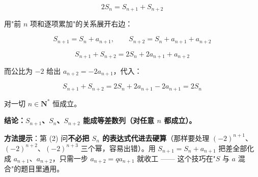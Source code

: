 \begin{answer}
\nopagebreak[4]
\[2S_n=S_{n+1}+S_{n+2}\]

用"前 $n$ 项和逐项累加"的关系展开右边：

\nopagebreak[4]
\[S_{n+1}=S_n+a_{n+1},\qquad S_{n+2}=S_n+a_{n+1}+a_{n+2}\]

\nopagebreak[4]
\[S_{n+1}+S_{n+2}=2S_n+2a_{n+1}+a_{n+2}\]

而公比为 $-2$ 给出 $a_{n+2}=-2a_{n+1}$，代入：

\nopagebreak[4]
\[S_{n+1}+S_{n+2}=2S_n+2a_{n+1}-2a_{n+1}=2S_n\]

对一切 $n\in\mathbf N^{*}$ 恒成立。

\textbf{结论：$S_{n+1}$、$S_n$、$S_{n+2}$ 能成等差数列（对任意 $n$ 都成立）。}

\begin{gktip}
\textbf{方法提示}：第 (2) 问\textbf{不必把 $S_n$ 的表达式代进去硬算}（那样要处理 $(-2)^{n+1}$、$(-2)^{n+2}$、$(-2)^{n+3}$ 三个幂，容易出错）。用 $S_{n+1}=S_n+a_{n+1}$ 把差全部化成 $a_{n+1}$、$a_{n+2}$，只需一步 $a_{n+2}=qa_{n+1}$ 就收工 —— 这个技巧在"$S$ 与 $a$ 混合"的题目里通用。
\end{gktip}



\par\medskip

\end{answer}
